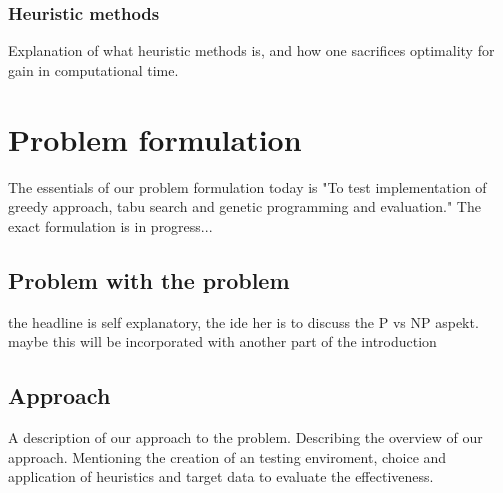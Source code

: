 \subsection{Heuristic methods}
Explanation of what heuristic methods is, and how one sacrifices
optimality for gain in computational time.\\

\chapter{Problem formulation}
The essentials of our problem formulation today is "To test
implementation of greedy approach, tabu search and genetic programming
and evaluation." The exact formulation is in progress...

\section{Problem with the problem}
the headline is self explanatory, the ide her is to discuss the P vs NP aspekt.
maybe this will be incorporated with another part of the introduction


\section{Approach}
A description of our approach to the problem. Describing the overview
of our approach. Mentioning the creation of an testing enviroment,
choice and application of heuristics and target data to evaluate the effectiveness.

